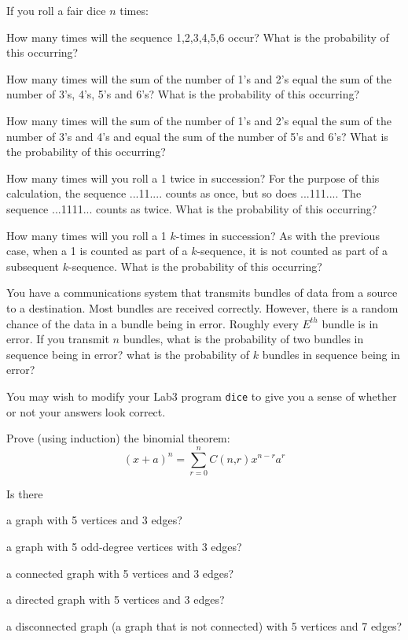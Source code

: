 
 If you roll a fair dice $n$ times:

\sq How many times will the sequence 1,2,3,4,5,6 occur?  What is the
probability of this occurring?

\sq How many times will the sum of the number of 1's and 2's equal the
sum of the number of 3's, 4's, 5's and 6's?  What is the probability
of this occurring?

\sq How many times will the sum of the number of 1's and 2's equal the
sum of the number of 3's and 4's and equal the sum of the number of
5's and 6's?  What is the probability of this occurring?

\sq How many times will you roll a 1 twice in succession?  For the
purpose of this calculation, the sequence ...11.... counts as once,
but so does ...111....  The sequence ...1111... counts as twice.  What
is the probability of this occurring?

\sq How many times will you roll a 1 $k$-times in succession?  As with
the previous case, when a 1 is counted as part of a $k$-sequence, it
is not counted as part of a subsequent $k$-sequence.  What
is the probability of this occurring?

\sq You have a communications system that transmits bundles of data
from a source to a destination.  Most bundles are received correctly.
However, there is a random chance of the data in a bundle being in
error.  Roughly every $E^{th}$ bundle is in error.  If you transmit
$n$ bundles, what is the probability of two bundles in sequence being
in error?  what is the probability of $k$ bundles in sequence being in
error?

You may wish to modify your Lab3 program {\tt dice} to give you a
sense of whether or not your answers look correct.

 Prove (using induction) the binomial theorem:
\[
(x+a)^n = \sum_{r=0}^n C(n‚ r)x^{n-r}a^r
\]

\newpage
{} Is there

\sq a graph with 5 vertices and 3 edges?

\sq a graph with 5 odd-degree vertices with 3 edges?

\sq a connected graph with 5 vertices and 3 edges?

\sq a directed graph with 5 vertices and 3 edges?

\sq a disconnected graph (a graph that is not connected) with 5
vertices and 7 edges?

